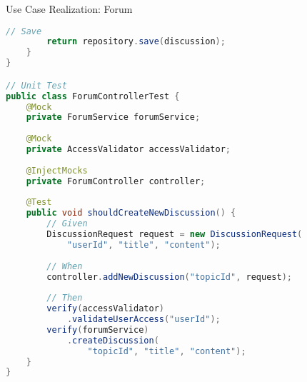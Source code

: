 \begin{example2}[breakable]{Use Case Realization: Forum}
\begin{lstlisting}[language=Java, style=basesmol]
        // Save
        return repository.save(discussion);
    }
}

// Unit Test
public class ForumControllerTest {
    @Mock
    private ForumService forumService;
    
    @Mock
    private AccessValidator accessValidator;
    
    @InjectMocks
    private ForumController controller;
    
    @Test
    public void shouldCreateNewDiscussion() {
        // Given
        DiscussionRequest request = new DiscussionRequest(
            "userId", "title", "content");
        
        // When
        controller.addNewDiscussion("topicId", request);
        
        // Then
        verify(accessValidator)
            .validateUserAccess("userId");
        verify(forumService)
            .createDiscussion(
                "topicId", "title", "content");
    }
}
\end{lstlisting}
\end{example2}

